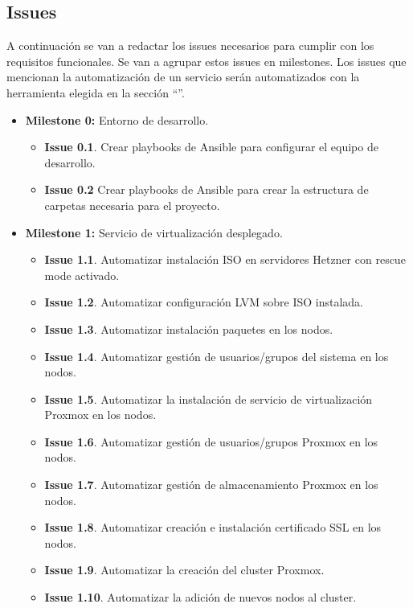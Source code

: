 \subsection{Issues}
\label{issues}
\begin{text}
	A continuación se van a redactar los issues necesarios para cumplir con los requisitos funcionales. Se van a agrupar estos issues en milestones. Los issues que mencionan la automatización de un servicio serán automatizados con la herramienta elegida en la sección ``''.
	
	\begin{itemize}
		\item \textbf{Milestone 0:} Entorno de desarrollo. 
		\begin{itemize}
			\item \textbf{Issue 0.1}. Crear playbooks de Ansible para configurar el equipo de desarrollo.
			\item \textbf{Issue 0.2} Crear playbooks de Ansible para crear la estructura de carpetas necesaria para el proyecto.
		\end{itemize}
		\item \textbf{Milestone 1:} Servicio de virtualización desplegado. 
		\begin{itemize}
			\item \textbf{Issue 1.1}. Automatizar instalación ISO en servidores Hetzner con rescue mode activado.
			\item \textbf{Issue 1.2}. Automatizar configuración LVM sobre ISO instalada.
			\item \textbf{Issue 1.3}. Automatizar instalación paquetes en los nodos.
			\item \textbf{Issue 1.4}. Automatizar gestión de usuarios/grupos del sistema en los nodos.
			\item \textbf{Issue 1.5}. Automatizar la instalación de servicio de virtualización Proxmox en los nodos.
			\item \textbf{Issue 1.6}. Automatizar gestión de usuarios/grupos Proxmox en los nodos.
			\item \textbf{Issue 1.7}. Automatizar gestión de almacenamiento Proxmox en los nodos.
			\item \textbf{Issue 1.8}. Automatizar creación e instalación certificado SSL en los nodos.
			\item \textbf{Issue 1.9}. Automatizar la creación del cluster Proxmox.
			\item \textbf{Issue 1.10}. Automatizar la adición de nuevos nodos al cluster.

\end{itemize}
\end{itemize}
\end{text}
